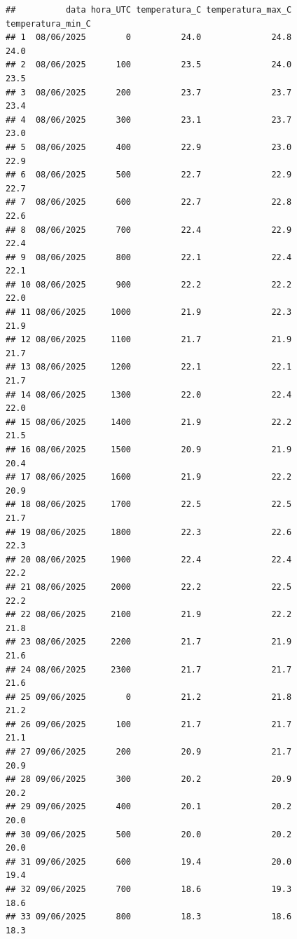 \documentclass[
]{article}
\begin{document}
\begin{verbatim}
##          data hora_UTC temperatura_C temperatura_max_C temperatura_min_C
## 1  08/06/2025        0          24.0              24.8              24.0
## 2  08/06/2025      100          23.5              24.0              23.5
## 3  08/06/2025      200          23.7              23.7              23.4
## 4  08/06/2025      300          23.1              23.7              23.0
## 5  08/06/2025      400          22.9              23.0              22.9
## 6  08/06/2025      500          22.7              22.9              22.7
## 7  08/06/2025      600          22.7              22.8              22.6
## 8  08/06/2025      700          22.4              22.9              22.4
## 9  08/06/2025      800          22.1              22.4              22.1
## 10 08/06/2025      900          22.2              22.2              22.0
## 11 08/06/2025     1000          21.9              22.3              21.9
## 12 08/06/2025     1100          21.7              21.9              21.7
## 13 08/06/2025     1200          22.1              22.1              21.7
## 14 08/06/2025     1300          22.0              22.4              22.0
## 15 08/06/2025     1400          21.9              22.2              21.5
## 16 08/06/2025     1500          20.9              21.9              20.4
## 17 08/06/2025     1600          21.9              22.2              20.9
## 18 08/06/2025     1700          22.5              22.5              21.7
## 19 08/06/2025     1800          22.3              22.6              22.3
## 20 08/06/2025     1900          22.4              22.4              22.2
## 21 08/06/2025     2000          22.2              22.5              22.2
## 22 08/06/2025     2100          21.9              22.2              21.8
## 23 08/06/2025     2200          21.7              21.9              21.6
## 24 08/06/2025     2300          21.7              21.7              21.6
## 25 09/06/2025        0          21.2              21.8              21.2
## 26 09/06/2025      100          21.7              21.7              21.1
## 27 09/06/2025      200          20.9              21.7              20.9
## 28 09/06/2025      300          20.2              20.9              20.2
## 29 09/06/2025      400          20.1              20.2              20.0
## 30 09/06/2025      500          20.0              20.2              20.0
## 31 09/06/2025      600          19.4              20.0              19.4
## 32 09/06/2025      700          18.6              19.3              18.6
## 33 09/06/2025      800          18.3              18.6              18.3

\end{verbatim}
\end{document}

